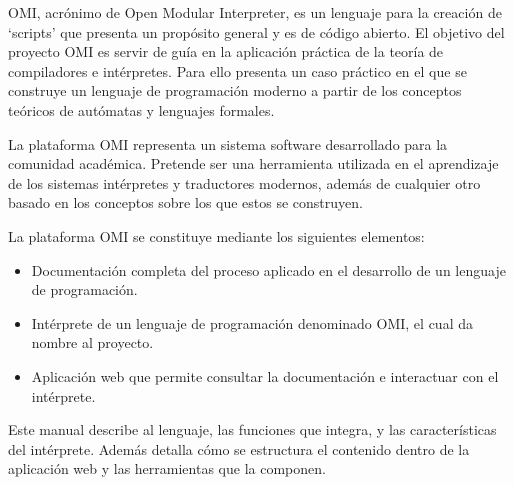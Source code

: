 OMI, acrónimo de Open Modular Interpreter, es un lenguaje para la creación de `scripts' que presenta un propósito general y es de código abierto.
El objetivo del proyecto OMI es servir de guía en la aplicación práctica de la teoría de compiladores e intérpretes. Para ello presenta un caso práctico 
en el que se construye un lenguaje de programación moderno a partir de los conceptos teóricos de autómatas y lenguajes formales. 

La plataforma OMI representa un sistema software desarrollado para la comunidad académica. Pretende ser una herramienta utilizada en el aprendizaje de
los sistemas intérpretes y traductores modernos, además de cualquier otro basado en los conceptos sobre los que estos se construyen. 

La plataforma OMI se constituye mediante los siguientes elementos:

\begin{itemize}
   \item Documentación completa del proceso aplicado en el desarrollo de un lenguaje de programación.
   \item Intérprete de un lenguaje de programación denominado OMI, el cual da nombre al proyecto.
   \item Aplicación web que permite consultar la documentación e interactuar con el intérprete. 
\end{itemize}

Este manual describe al lenguaje, las funciones que integra, y las características del intérprete. Además detalla cómo se 
estructura el contenido dentro de la aplicación web y las herramientas que la componen.


